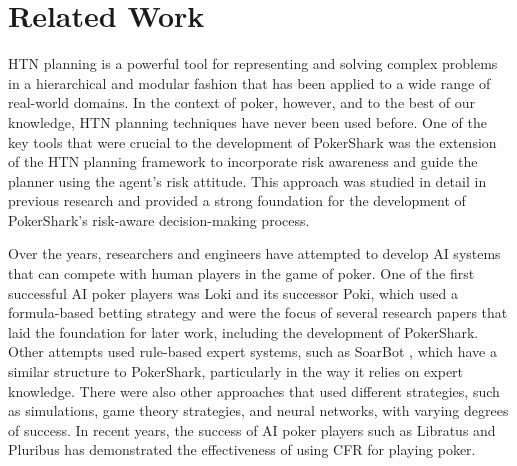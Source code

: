\section{Related Work}
HTN planning is a powerful tool for representing and solving complex problems in a hierarchical and modular fashion that has been applied to a wide range of real-world domains. In the context of poker, however, and to the best of our knowledge, HTN planning techniques have never been used before. One of the key tools that were crucial to the development of PokerShark was the extension of the HTN planning framework to incorporate risk awareness and guide the planner using the agent's risk attitude. This approach was studied in detail in previous research \cite{alnazer2019htn} \cite{georgievski2014utility}  \cite{alnazer2022risk} and provided a strong foundation for the development of PokerShark's risk-aware decision-making process.

Over the years, researchers and engineers have attempted to develop AI systems that can compete with human players in the game of poker. One of the first successful AI poker players was Loki and its successor Poki, which used a formula-based betting strategy and were the focus of several research papers \cite{billings_challenge_2002}  \cite{billings1998poker} \cite{papp_dealing_1998} that laid the foundation for later work, including the development of PokerShark. Other attempts used rule-based expert systems, such as SoarBot \cite{follek2003soarbot}, which have a similar structure to PokerShark, particularly in the way it relies on expert knowledge. There were also other approaches that used different strategies, such as simulations, game theory strategies, and neural networks, with varying degrees of success. In recent years, the success of AI poker players such as Libratus \cite{brown2018superhuman} and Pluribus \cite{blair2019ai} has demonstrated the effectiveness of using CFR for playing poker.

